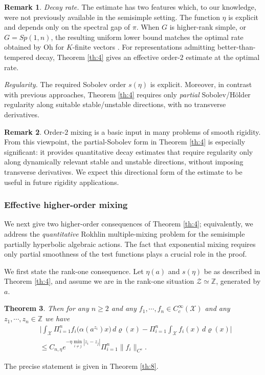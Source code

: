 \documentclass[11 pt]{amsart}
\newcommand{\ZZ}{\mathbb{Z}}
\newcommand{\norm}[1]{\lVert#1\rVert}
\newtheorem{theorem}{Theorem}[section]
\theoremstyle{definition}
\newtheorem{remark}[theorem]{Remark}
\numberwithin{equation}{section}
\begin{document}
\begin{remark}\emph{Decay rate.} The estimate has two features which, to our knowledge, were not
previously available in the semisimple setting. The function \(\eta\) is explicit and depends only on the spectral gap of \(\pi\). When \(G\) is higher-rank simple, or \(G=Sp(1,n)\), the resulting uniform lower bound matches the optimal rate obtained by Oh for \(K\)-finite vectors \cite{oh}. For representations admitting better-than-tempered decay, Theorem \ref{th:4} gives an effective order-$2$ estimate at the optimal rate.



\emph{Regularity.} The required Sobolev order \(s(\eta)\) is explicit. Moreover, in contrast with previous approaches, Theorem \ref{th:4} requires only \emph{partial} Sobolev/H\"older regularity along suitable stable/unstable directions, with no transverse derivatives.

\end{remark}
\begin{remark}Order-$2$ mixing is a basic input in many problems of smooth rigidity. From this viewpoint, the partial-Sobolev form in Theorem \ref{th:4} is especially significant: it provides quantitative decay estimates that require regularity only along dynamically relevant stable and unstable directions, without imposing transverse derivatives. We expect this directional form of the estimate to be useful in future rigidity applications.
\end{remark}
\subsubsection{Effective higher-order mixing} We next give two higher-order consequences of Theorem \ref{th:4};  equivalently,
we address the  \emph{quantitative} Rokhlin multiple-mixing problem for the
semisimple partially hyperbolic algebraic actions. The fact that exponential mixing requires only partial smoothness of the test functions  plays a crucial role in the proof.


We first state the rank-one consequence. Let $\eta(a)$ and $s(\eta)$ be as described in Theorem \ref{th:4}, and assume we are in the
rank-one situation \(\mathcal Z\simeq \mathbb Z\), generated by \(a\).
\begin{theorem}\label{th:12}  Then for any $n\geq2$ and any $f_1,\cdots, f_n\in C_c^\infty(\mathcal{X})$ and any $z_1,\cdots, z_n\in\ZZ$ we have
\begin{align*}
   &\Big|\int_{\mathcal{X}} \Pi_{i=1}^{n} f_i\big(\alpha(a^{z_i})x\big) \, d\varrho(x) - \Pi_{i=1}^{n} \int_{\mathcal{X}} f_i(x) \, d\varrho(x)\Big|\\
   &\leq C_{n,\eta}e^{-\eta\min_{i \neq j} |z_i-z_j|}\Pi_{i=1}^{n} \norm{f_i}_{C^s}.
  \end{align*}

\end{theorem}
The precise statement is given in Theorem \ref{th:8}.
\end{document}
